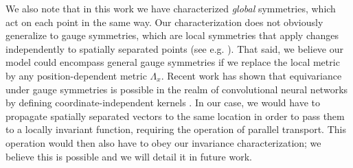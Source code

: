 \documentclass{article}
\theoremstyle{Hogg}
\begin{document}
We also note that in this work we have characterized \emph{global} symmetries, which act on each point in the same way.
Our characterization does not obviously generalize to gauge symmetries, which are local symmetries that apply changes independently to spatially separated points (see e.g. \cite{Bronstein2021GeometricDL}).
That said, we believe our model could encompass general gauge symmetries if we replace the local metric by any position-dependent metric $\Lambda_x$.
Recent work has shown that equivariance under gauge symmetries is possible in the realm of convolutional neural networks by defining coordinate-independent kernels \cite{weiler2021coordinate}.
In our case, we would have to propagate spatially separated vectors to the same location in order to pass them to a locally invariant function, requiring the operation of parallel transport.
This operation would then also have to obey our invariance characterization; we believe this is possible and we will detail it in future work.
\end{document}
